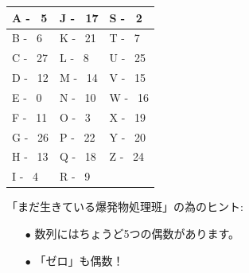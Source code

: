 \begin{center}
\large
\def\arraystretch{1.5}
\begin{tabular}{|l|l|l}
    \hline
    A - \ 5 \hspace*{1em}  & J - \ 17\hspace*{1em}  & \multicolumn{1}{l|}{S - \ 2\hspace*{1em} }   \\ \hline
    B - \ 6 \hspace*{1em}  & K - \ 21\hspace*{1em}  & \multicolumn{1}{l|}{T - \ 7\hspace*{1em} }   \\ \hline
    C - \ 27\hspace*{1em}  & L - \ 8 \hspace*{1em}  & \multicolumn{1}{l|}{U - \ 25\hspace*{1em} } \\ \hline
    D - \ 12\hspace*{1em}  & M - \ 14\hspace*{1em}  & \multicolumn{1}{l|}{V - \ 15\hspace*{1em} } \\ \hline
    E - \ 0 \hspace*{1em}  & N - \ 10\hspace*{1em}  & \multicolumn{1}{l|}{W - \ 16\hspace*{1em} } \\ \hline
    F - \ 11\hspace*{1em}  & O - \ 3 \hspace*{1em}  & \multicolumn{1}{l|}{X - \ 19\hspace*{1em} } \\ \hline
    G - \ 26\hspace*{1em}  & P - \ 22\hspace*{1em}  & \multicolumn{1}{l|}{Y - \ 20\hspace*{1em} } \\ \hline
    H - \ 13\hspace*{1em}  & Q - \ 18\hspace*{1em}  & \multicolumn{1}{l|}{Z - \ 24\hspace*{1em} } \\ \hline
    I - \ 4 \hspace*{1em}  & R - \ 9 \hspace*{1em}  &                             \\\cline{1-2}
\end{tabular}
\end{center}


「まだ生きている爆発物処理班」の為のヒント:
\begin{itemize}
    \item[$\bullet$] 数列にはちょうど5つの偶数があります。
    \item[$\bullet$] 「ゼロ」も偶数！
\end{itemize}
